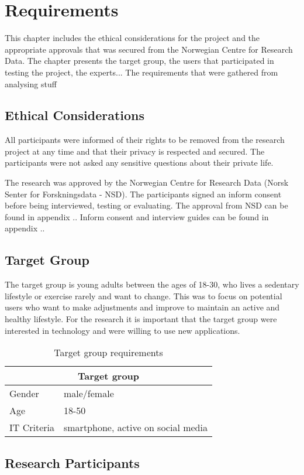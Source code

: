 \chapter{Requirements}
This chapter includes the ethical considerations for the project and the appropriate approvals that was secured from the Norwegian Centre for Research Data. The chapter presents the target group, the users that participated in testing the project, the experts... The requirements that were gathered from analysing stuff
\section{Ethical Considerations}
All participants were informed of their rights to be removed from the research project at any time and that their privacy is respected and secured. The participants were not asked any sensitive questions about their private life. 

The research was approved by the Norwegian Centre for Research Data (Norsk Senter for Forskningsdata - NSD). The participants signed an inform consent before being interviewed, testing or evaluating. The approval from NSD can be found in appendix .. Inform consent and interview guides can be found in appendix ..
\section{Target Group}
The target group is young adults between the ages of 18-30, who lives a sedentary lifestyle or exercise rarely and want to change. This was to focus on potential users who want to make adjustments and improve to maintain an active and healthy lifestyle. For the research it is important that the target group were interested in technology and were willing to use new applications. 

\begin{table}[H]
\centering
\begin{tabular}{ |l|l| }
  \hline
  \multicolumn{2}{|c|}{Target group} \\
  \hline
Gender & male/female\\ 
\hline
Age & 18-50\\
\hline
IT Criteria & smartphone, active on social media\\ 
  \hline
\end{tabular}
\label{tab:3}
\caption{Target group requirements}
\end{table}


\section{Research Participants}

